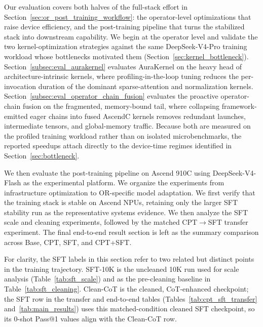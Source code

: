 
\label{subsec:stagewise_experimental_validation}

Our evaluation covers both halves of the full-stack effort in Section~\ref{sec:or_post_training_workflow}: the operator-level optimizations that raise device efficiency, and the post-training pipeline that turns the stabilized stack into downstream capability. We begin at the operator level and validate the two kernel-optimization strategies against the same DeepSeek-V4-Pro training workload whose bottlenecks motivated them (Section~\ref{sec:kernel_bottleneck}). Section~\ref{subsec:eval_aurakernel} evaluates AuraKernel on the heavy head of architecture-intrinsic kernels, where profiling-in-the-loop tuning reduces the per-invocation duration of the dominant sparse-attention and normalization kernels. Section~\ref{subsec:eval_operator_chain_fusion} evaluates the proactive operator-chain fusion on the fragmented, memory-bound tail, where collapsing framework-emitted eager chains into fused AscendC kernels removes redundant launches, intermediate tensors, and global-memory traffic. Because both are measured on the profiled training workload rather than on isolated microbenchmarks, the reported speedups attach directly to the device-time regimes identified in Section~\ref{sec:bottleneck}.

We then evaluate the post-training pipeline on Ascend 910C using
DeepSeek-V4-Flash as the experimental platform. We organize the experiments from infrastructure optimization to OR-specific model adaptation. We first verify that the training stack is stable on Ascend NPUs, retaining only the larger SFT stability run as the representative systems evidence. We then analyze the SFT scale and cleaning experiments, followed by the matched CPT$\rightarrow$SFT
transfer experiment. 
The final end-to-end result section is left as the summary comparison across Base, CPT, SFT, and CPT+SFT.


For clarity, the SFT labels in this section refer to two related but distinct points in the training trajectory. SFT-10K is the uncleaned 10K run used for scale analysis (Table~\ref{tab:sft_scale}) and as the pre-cleaning baseline in Table~\ref{tab:sft_cleaning}. Clean-CoT is the cleaned, CoT-enhanced checkpoint; the SFT row in the transfer and end-to-end tables (Tables~\ref{tab:cpt_sft_transfer} and~\ref{tab:main_results}) uses this matched-condition cleaned SFT checkpoint, so its 0-shot Pass@1 values align with the Clean-CoT row.

